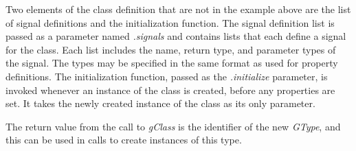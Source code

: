 \documentclass[article]{jss}
\begin{document}
Two elements of the class definition that are not in the example above
are
the list of signal definitions and the initialization function.
The signal definition list is passed as a parameter named
\emph{.signals} and contains lists that each define a signal for the
class. Each list includes the name, return type, and parameter types
of the signal. The types may be specified in the same format as used
for property definitions. The initialization function, passed as the
\emph{.initialize} parameter, is invoked whenever an instance of
the class is created, before any properties are set. It takes the newly created instance of the class as its only parameter.





The return value from the call to \emph{gClass} is the identifier of the new \emph{GType}, and this can be used in calls to create instances of this type.
\end{document}
